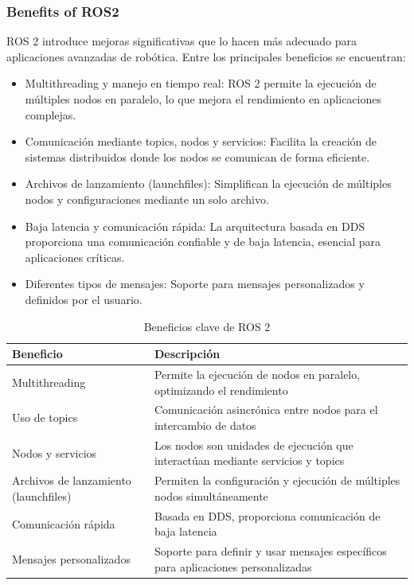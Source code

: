     \subsubsection{Benefits of ROS2}

    ROS 2 introduce mejoras significativas que lo hacen más adecuado para aplicaciones avanzadas de robótica. Entre los principales beneficios se encuentran:

    \begin{itemize} \item Multithreading y manejo en tiempo real: ROS 2 permite la ejecución de múltiples nodos en paralelo, lo que mejora el rendimiento en aplicaciones complejas. \item Comunicación mediante topics, nodos y servicios: Facilita la creación de sistemas distribuidos donde los nodos se comunican de forma eficiente. \item Archivos de lanzamiento (launchfiles): Simplifican la ejecución de múltiples nodos y configuraciones mediante un solo archivo. \item Baja latencia y comunicación rápida: La arquitectura basada en DDS proporciona una comunicación confiable y de baja latencia, esencial para aplicaciones críticas. \item Diferentes tipos de mensajes: Soporte para mensajes personalizados y definidos por el usuario. \end{itemize}

    \begin{table}[h!]
    \centering
    \caption{Beneficios clave de ROS 2}
    \begin{tabular}{|l|p{10cm}|}
    \hline
    \textbf{Beneficio} & \textbf{Descripción} \\
    \hline
    Multithreading & Permite la ejecución de nodos en paralelo, optimizando el rendimiento \\
    \hline
    Uso de topics & Comunicación asincrónica entre nodos para el intercambio de datos \\
    \hline
    Nodos y servicios & Los nodos son unidades de ejecución que interactúan mediante servicios y topics \\
    \hline
    Archivos de lanzamiento (launchfiles) & Permiten la configuración y ejecución de múltiples nodos simultáneamente \\
    \hline
    Comunicación rápida & Basada en DDS, proporciona comunicación de baja latencia \\
    \hline
    Mensajes personalizados & Soporte para definir y usar mensajes específicos para aplicaciones personalizadas \\
    \hline
    \end{tabular}
    \label{table}
    \end{table}

